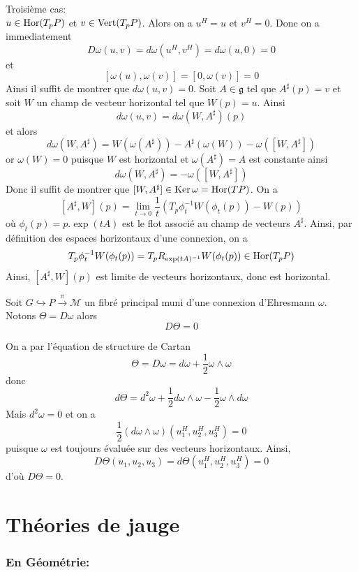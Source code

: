 \documentclass[12pt, a4paper]{book}
\begin{document}
\begin{preu}
Troisième cas: \\
$u\in \operatorname{Hor}(T_pP)$ et $v\in \operatorname{Vert}(T_pP)$. Alors on a $u^H = u$ et $v^H = 0$. Donc on a immediatement 
$$D\omega(u,v) = d\omega(u^H, v^H) = d\omega(u, 0) = 0$$
et 
$$[\omega(u), \omega(v)] = [0, \omega(v)] = 0$$
Ainsi il suffit de montrer que $d\omega(u, v) = 0$. Soit $A\in \mathfrak{g}$ tel que $A^\sharp(p) = v$ et soit $W$ un champ de vecteur horizontal tel que $W(p) = u$. Ainsi
$$d\omega(u,v) = d\omega(W, A^\sharp)(p)$$
et alors 
$$d\omega(W, A^\sharp) = W(\omega(A^\sharp)) - A^\sharp(\omega(W)) - \omega([W, A^\sharp])$$
or $\omega(W) = 0$ puisque $W$ est horizontal et $\omega(A^\sharp) = A$ est constante ainsi
$$d\omega(W, A^\sharp) = - \omega([W, A^\sharp])$$
Donc il suffit de montrer que $[W, A^\sharp] \in \operatorname{Ker}\omega = \operatorname{Hor}(TP)$. On a
$$[A^\sharp, W](p) = \lim_{t\to 0} \frac{1}{t}\left(T_p\phi_t^{-1}W(\phi_t(p))-W(p)\right)$$
où $\phi_t(p) = p.\exp(tA)$ est le flot associé au champ de vecteurs $A^\sharp$. Ainsi, par définition des espaces horizontaux d'une connexion, on a 
$$T_p\phi_t^{-1}W(\phi_t(p)) = T_pR_{\exp(tA)^{-1}} W(\phi_t(p)) \in \operatorname{Hor}(T_pP)$$
Ainsi, $[A^\sharp, W](p)$ est limite de vecteurs horizontaux, donc est horizontal.
\end{preu}

\begin{pro}
Soit $G \hookrightarrow P \overset{\pi}{\to} \mathcal{M}$ un fibré principal muni d'une connexion d'Ehresmann $\omega$. Notons $\Theta = D\omega$ alors
$$D\Theta = 0$$
\end{pro}
\begin{preu}
On a par l'équation de structure de Cartan
$$\Theta = D\omega = d\omega + \frac{1}{2}\omega \wedge \omega$$
donc 
$$d\Theta = d^2\omega + \frac{1}{2}d\omega \wedge \omega - \frac{1}{2}\omega \wedge d\omega$$
Mais $d^2\omega = 0$ et on a 
$$\frac{1}{2}(d\omega \wedge \omega)(u_1^H, u_2^H, u_3^H) = 0$$
puisque $\omega$ est toujours évaluée sur des vecteurs horizontaux.
Ainsi,
$$D\Theta(u_1, u_2, u_3) = d\Theta(u_1^H, u_2^H, u_3^H) = 0$$
d'où $D\Theta = 0$.
\end{preu}

\newpage
\section{Théories de jauge}

\subsubsection{En Géométrie:}
\end{document}
